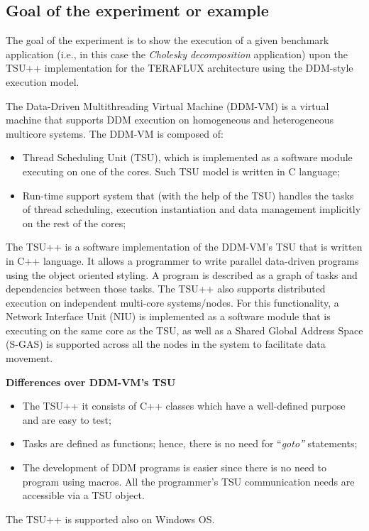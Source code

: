 \documentclass[a4paper]{article}
\begin{document}
\subsection[Goal of the experiment or example]{Goal of the experiment or
example}
{
The goal of the experiment is to show the execution of a given benchmark
application (i.e., in this case the \textit{Cholesky decomposition}
application) upon the TSU++ implementation for the TERAFLUX
architecture using the DDM-style execution model.}

{
The Data-Driven Multithreading Virtual Machine (DDM-VM) is a virtual
machine that supports DDM execution on homogeneous and heterogeneous
multicore systems. The DDM-VM is composed of:}

\begin{itemize}
\item {
Thread Scheduling Unit (TSU), which is implemented as a software module
executing on one of the cores. Such TSU model is written in C
language;}
\item {
Run-time support system that (with the help of the TSU) handles the
tasks of thread scheduling, execution instantiation and data management
implicitly on the rest of the cores;}
\end{itemize}
{
The TSU++ is a software implementation of the DDM-VM{\textquoteright}s
TSU that is written in C++ language. It allows a programmer to write
parallel data-driven programs using the object oriented styling. A
program is described as a graph of tasks and dependencies between those
tasks. The TSU++ also supports distributed execution on independent
multi-core systems/nodes. For this functionality, a Network Interface
Unit (NIU) is implemented as a software module that is executing on the
same core as the TSU, as well as a Shared Global Address Space (S-GAS)
is supported across all the nodes in the system to facilitate data
movement.}

{\bfseries
Differences over DDM-VM{\textquoteright}s TSU}

\begin{itemize}
\item {
The TSU++ it consists of C++ classes which have a well-defined purpose
and are easy to test;}
\item {
Tasks are defined as functions; hence, there is no need for
{\textquotedblleft}\textit{goto{\textquotedblright}} statements;}
\item {
The development of DDM programs is easier since there is no need to
program using macros. All the programmer{\textquoteright}s TSU
communication needs are accessible via a TSU object. \ }
\end{itemize}
{
The TSU++ is supported also on Windows OS.}
\end{document}
